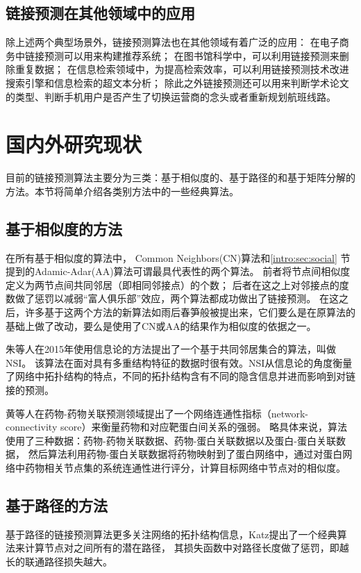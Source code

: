 \subsection{链接预测在其他领域中的应用}
除上述两个典型场景外，链接预测算法也在其他领域有着广泛的应用：
在电子商务中链接预测可以用来构建推荐系统；
在图书馆科学中，可以利用链接预测来删除重复数据；
在信息检索领域中，为提高检索效率，可以利用链接预测技术改进搜索引擎和信息检索的超文本分析\cite{李淑玲2012基于相似性的链接预测方法研究}；
除此之外链接预测还可以用来判断学术论文的类型、判断手机用户是否产生了切换运营商的念头\cite{李淑玲2012基于相似性的链接预测方法研究}或者重新规划航班线路。


\section{国内外研究现状}
\label{intro:sec:study}
目前的链接预测算法主要分为三类：基于相似度的、基于路径的和基于矩阵分解的方法。本节将简单介绍各类别方法中的一些经典算法。

\subsection{基于相似度的方法}
在所有基于相似度的算法中，
Common Neighbors(CN)算法和\ref{intro:sec:social} 节提到的Adamic-Adar(AA)算法可谓最具代表性的两个算法。
前者将节点间相似度定义为两节点间共同邻居（即相同邻接点）的个数；
后者在这之上对邻接点的度数做了惩罚以减弱“富人俱乐部”效应，两个算法都成功做出了链接预测。
在这之后，许多基于这两个方法的新算法如雨后春笋般被提出来，它们要么是在原算法的基础上做了改动，要么是使用了CN或AA的结果作为相似度的依据之一。


朱等人在2015年使用信息论的方法提出了一个基于共同邻居集合的算法，叫做NSI。
该算法在面对具有多重结构特征的数据时很有效。NSI从信息论的角度衡量了网络中拓扑结构的特点，不同的拓扑结构含有不同的隐含信息并进而影响到对链接的预测\cite{chen2014robust}。


黄等人在药物-药物关联预测领域提出了一个网络连通性指标（network-connectivity score）来衡量药物和对应靶蛋白间关系的强弱。
略具体来说，算法使用了三种数据：药物-药物关联数据、药物-蛋白关联数据以及蛋白-蛋白关联数据，
然后算法利用药物-蛋白关联数据将药物映射到了蛋白网络中，通过对蛋白网络中药物相关节点集的系统连通性进行评分，计算目标网络中节点对的相似度\cite{scellato2011exploiting}。


\subsection{基于路径的方法}
基于路径的链接预测算法更多关注网络的拓扑结构信息，Katz提出了一个经典算法来计算节点对之间所有的潜在路径，
其损失函数中对路径长度做了惩罚，即越长的联通路径损失越大\cite{elhamifar2013sparse}。


